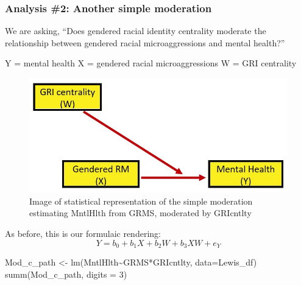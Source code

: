 \documentclass[
  english,
]{book}
\newenvironment{Shaded}{\begin{snugshade}}{\end{snugshade}}
\newcommand{\AttributeTok}[1]{\textcolor[rgb]{0.77,0.63,0.00}{#1}}
\newcommand{\DecValTok}[1]{\textcolor[rgb]{0.00,0.00,0.81}{#1}}
\newcommand{\FunctionTok}[1]{\textcolor[rgb]{0.00,0.00,0.00}{#1}}
\newcommand{\NormalTok}[1]{#1}
\newcommand{\OtherTok}[1]{\textcolor[rgb]{0.56,0.35,0.01}{#1}}
\newcommand{\SpecialCharTok}[1]{\textcolor[rgb]{0.00,0.00,0.00}{#1}}
\begin{document}
\hypertarget{analysis-2-another-simple-moderation}{%
\subsubsection{Analysis \#2: Another simple moderation}\label{analysis-2-another-simple-moderation}}

We are asking, ``Does gendered racial identity centrality moderate the relationship between gendered racial microaggressions and mental health?''

Y = mental health
X = gendered racial microaggressions
W = GRI centrality

\begin{figure}
\centering
\includegraphics{images/ModMed/LewisMod2.jpg}
\caption{Image of statistical representation of the simple moderation estimating MntlHlth from GRMS, moderated by GRIcntlty}
\end{figure}

As before, this is our formulaic rendering:\\
\[Y=b_{0}+b_{1}X+b_{2}W+b_{3}XW+e_{Y}\]

\begin{Shaded}
\begin{Highlighting}[]
\NormalTok{Mod\_c\_path }\OtherTok{\textless{}{-}} \FunctionTok{lm}\NormalTok{(MntlHlth}\SpecialCharTok{\textasciitilde{}}\NormalTok{GRMS}\SpecialCharTok{*}\NormalTok{GRIcntlty, }\AttributeTok{data=}\NormalTok{Lewis\_df)}
\FunctionTok{summ}\NormalTok{(Mod\_c\_path, }\AttributeTok{digits =} \DecValTok{3}\NormalTok{)}
\end{Highlighting}
\end{Shaded}
\end{document}
